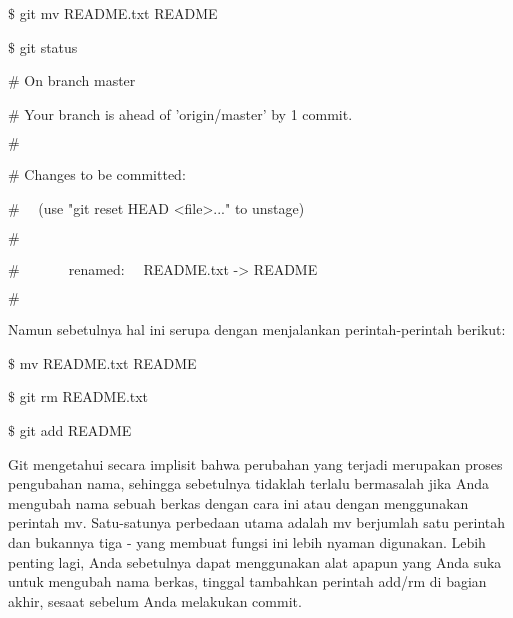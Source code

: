\noindent 
 $  \$  $ git mv README.txt README \par
\noindent 
 $  \$  $ git status \par
\noindent 
 $  \#  $ On branch master \par
\noindent 
 $  \#  $ Your branch is ahead of 'origin/master' by 1 commit. \par
\noindent 
 $  \#  $ \par
\noindent 
 $  \#  $ Changes to be committed: \par
\noindent 
 $  \#  $~~ (use "git reset HEAD <file>..." to unstage) \par
\noindent 
 $  \#  $ \par
\noindent 
 $  \#  $~~~~~~~renamed:~~  README.txt -> README \par
\noindent 
 $  \#  $ \par
\noindent 
Namun sebetulnya hal ini serupa dengan menjalankan perintah-perintah berikut: \par
\noindent 
 $  \$  $ mv README.txt README \par
\noindent 
 $  \$  $ git rm README.txt \par
\noindent 
 $  \$  $ git add README \par
\noindent 
Git mengetahui secara implisit bahwa perubahan yang terjadi merupakan proses pengubahan nama, sehingga sebetulnya tidaklah terlalu bermasalah jika Anda mengubah nama sebuah berkas dengan cara ini atau dengan menggunakan perintah $  $mv. Satu-satunya perbedaan utama adalah $  $mv $  $berjumlah satu perintah dan bukannya tiga - yang membuat fungsi ini lebih nyaman digunakan. Lebih penting lagi, Anda sebetulnya dapat menggunakan alat apapun yang Anda suka untuk mengubah nama berkas, tinggal tambahkan perintah add/rm di bagian akhir, sesaat sebelum Anda melakukan commit. \par
\vspace{12pt}
\vspace{12pt}
\vspace{12pt}
\vspace{12pt}
\vspace{12pt}
